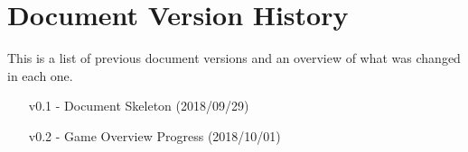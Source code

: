 
\section{Document Version History}
This is a list of previous document versions and an overview of what was changed in each one.
\begin{itemize}[leftmargin=5em]
    \item [v0.1 -] Document Skeleton (2018/09/29)
    \item [v0.2 -] Game Overview Progress (2018/10/01)
\end{itemize}

\newpage